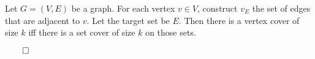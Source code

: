\documentclass{amsart}
\begin{document}
Let $G = (V, E)$ be a graph. For each vertex $v \in V$, construct $v_{E}$ the set of edges that are adjacent to $v$. Let the target set be $E$. Then there is a vertex cover of size $k$ iff there is a set cover of size $k$ on those sets.

\hfill$\qed$
\end{document}
